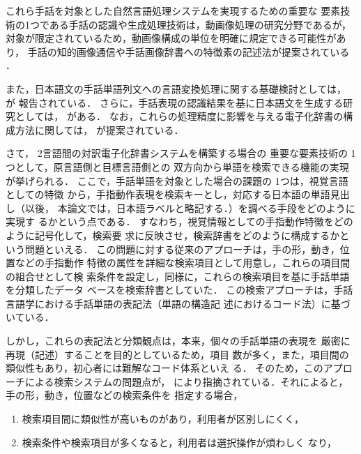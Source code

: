 これら手話を対象とした自然言語処理システムを実現するための重要な
要素技術の1つである手話の認識や生成処理技術は，動画像処理の研究分野であるが，
対象が限定されているため，動画像構成の単位を明確に規定できる可能性があり，
手話の知的画像通信や手話画像辞書への特徴素の記述法が提案されている
\cite[など]{Kurokawa1988,Kawai1990,Sagawa1992,Terauchi1992,Nagashima1993,JunXU1993}．

また，日本語文の手話単語列文への言語変換処理に関する基礎検討としては，
\cite[など]{Kamata1992,Adachi1992b,Adachi1992c,Kamata1994,Terauchi1996}が
報告されている．
さらに，手話表現の認識結果を基に日本語文を生成する研究としては，
\cite[など]{Sagawa1992,Abe1993}がある．
なお，これらの処理精度に影響を与える電子化辞書の構成方法に関しては，
\cite[など]{Adachi1993,Nagashima1993,Tokuda1998}が提案されている．

さて， 2言語間の対訳電子化辞書システムを構築する場合の
重要な要素技術の 1つとして，原言語側と目標言語側との
双方向から単語を検索できる機能の実現が挙げられる．
ここで，手話単語を対象とした場合の課題の 1つは，視覚言語としての特徴
から，手指動作表現を検索キーとし，対応する日本語の単語見出し（以後，
本論文では，日本語ラベルと略記する．）を調べる手段をどのように実現す
るかという点である．
すなわち，視覚情報としての手指動作特徴をどのように記号化して，検索要
求に反映させ，検索辞書をどのように構成するかという問題といえる．
この問題に対する従来のアプローチは，手の形，動き，位置などの手指動作
特徴の属性を詳細な検索項目として用意し，これらの項目間の組合せとして検
索条件を設定し，同様に，これらの検索項目を基に手話単語を分類したデータ
ベースを検索辞書としていた\cite[など]{KatoYuji1993,Naitou1994}．
この検索アプローチは，手話言語学における手話単語の表記法（単語の構造記
述におけるコード法）に基づいている\cite{Kanda1984,Kanda1985}．

しかし，これらの表記法と分類観点は，本来，個々の手話単語の表現を
厳密に再現（記述）することを目的としているため\cite{Stokoe1976}，項目
数が多く，また，項目間の類似性もあり，初心者には難解なコード体系といえ
る．
そのため，このアプローチによる検索システムの問題点が，\cite{Naitou1996}
により指摘されている．それによると，手の形，動き，位置などの検索条件を
指定する場合，

\begin{enumerate}
\item 検索項目間に類似性が高いものがあり，利用者が区別しにくく，
\item 検索条件や検索項目が多くなると，利用者は選択操作が煩わしく
なり，
\end{enumerate}

